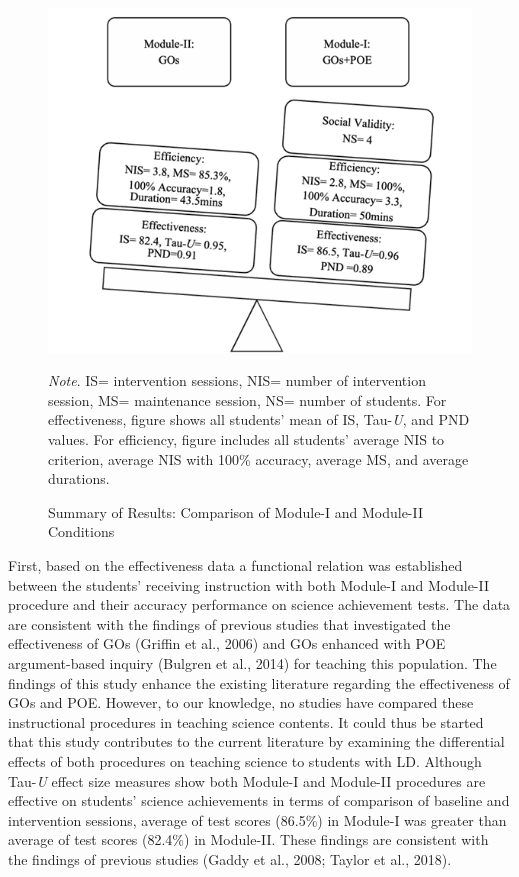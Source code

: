 \documentclass[11.5pt]{sig-alternate} %
\begin{document}
\begin{large}
\begin{figure}[ht]
    \includegraphics[width=1\linewidth]{images/fig5.png}
    \caption{Summary of Results: Comparison of Module-I and Module-II Conditions} \vspace{1em}
    {\textit{Note}. IS= intervention sessions, NIS= number of intervention session, MS= maintenance session, NS= number of students. For effectiveness, figure shows all students’ mean of IS, Tau-\textit{U}, and PND values. For efficiency, figure includes all students’ average NIS to criterion, average NIS with 100\% accuracy, average MS, and average durations.}
\end{figure}

First, based on the effectiveness data a functional relation was established between the students’ receiving instruction with both Module-I and Module-II procedure and their accuracy performance on science achievement tests. The data are consistent with the findings of previous studies that investigated the effectiveness of GOs (Griffin et al., 2006) and GOs enhanced with POE argument-based inquiry (Bulgren et al., 2014) for teaching this population. The findings of this study enhance the existing literature regarding the effectiveness of GOs and POE. However, to our knowledge, no studies have compared these instructional procedures in teaching science contents. It could thus be started that this study contributes to the current literature by examining the differential effects of both procedures on teaching science to students with LD. Although Tau-\textit{U} effect size measures show both Module-I and Module-II procedures are effective on students’ science achievements in terms of comparison of baseline and intervention sessions, average of test scores (86.5\%) in Module-I was greater than average of test scores (82.4\%) in Module-II. These findings are consistent with the findings of previous studies (Gaddy et al., 2008; Taylor et al., 2018).


\end{large}
\end{document}
